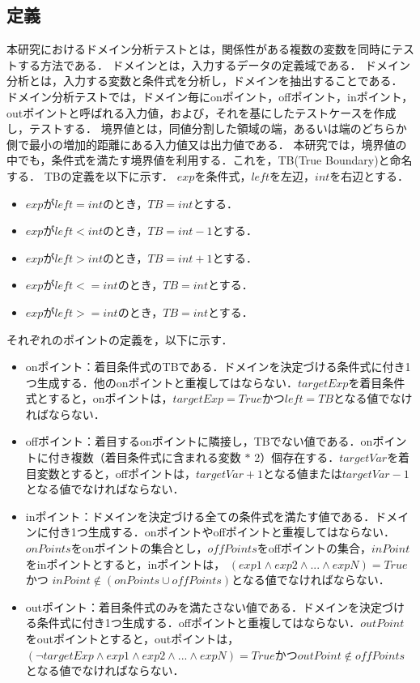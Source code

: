 \documentclass[uplatex, report, a4j, 10pt]{jsbook}
\begin{document}
\subsection{定義}\label{sec:define}
本研究におけるドメイン分析テストとは，関係性がある複数の変数を同時にテストする方法である\cite{izon}\cite{jstqb}．
ドメインとは，入力するデータの定義域である．
ドメイン分析とは，入力する変数と条件式を分析し，ドメインを抽出することである．
ドメイン分析テストでは，ドメイン毎にonポイント，offポイント，inポイント，outポイントと呼ばれる入力値，および，それを基にしたテストケースを作成し，テストする．
境界値とは，同値分割した領域の端，あるいは端のどちらか側で最小の増加的距離にある入力値又は出力値である\cite{jstqb}．
本研究では，境界値の中でも，条件式を満たす境界値を利用する．これを，TB(True Boundary)と命名する．
TBの定義を以下に示す．
$exp$を条件式，$left$を左辺，$int$を右辺とする．
\begin{itemize}
	\item $exp$が$left = int$のとき，$TB = int$とする．
	\item $exp$が$left < int$のとき，$TB = int - 1$とする．
	\item $exp$が$left > int$のとき，$TB = int + 1$とする．
	\item $exp$が$left <= int$のとき，$TB = int$とする．
	\item $exp$が$left >= int$のとき，$TB = int$とする．
\end{itemize}
それぞれのポイントの定義を，以下に示す．
\begin{itemize}
	\item onポイント：着目条件式のTBである．ドメインを決定づける条件式に付き1つ生成する．他のonポイントと重複してはならない．$targetExp$を着目条件式とすると，onポイントは，$targetExp = True$かつ$left = TB$となる値でなければならない．
	\item offポイント：着目するonポイントに隣接し，TBでない値である．onポイントに付き複数（着目条件式に含まれる変数 $*$ 2）個存在する．$targetVar$を着目変数とすると，offポイントは，$targetVar + 1$となる値または$targetVar - 1$となる値でなければならない．
	\item inポイント：ドメインを決定づける全ての条件式を満たす値である．ドメインに付き1つ生成する．onポイントやoffポイントと重複してはならない．$onPoints$をonポイントの集合とし，$offPoints$をoffポイントの集合，$inPoint$をinポイントとすると，inポイントは， $(exp1 \land exp2 \land ... \land expN) = True$ かつ $inPoint \notin (onPoints \cup offPoints)$となる値でなければならない．
	\item outポイント：着目条件式のみを満たさない値である．ドメインを決定づける条件式に付き1つ生成する．offポイントと重複してはならない．$outPoint$をoutポイントとすると，outポイントは，$ (\lnot targetExp \land exp1 \land exp2 \land ... \land expN) = True$かつ$outPoint \notin offPoints$となる値でなければならない．
\end{itemize}
\end{document}
